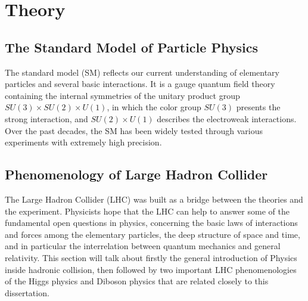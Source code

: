 
\chapter{Theory}

\section{The Standard Model of Particle Physics}
The standard model (SM) reflects our current understanding of elementary particles and several basic interactions.
It is a gauge quantum field theory containing the internal symmetries of the unitary product group $SU(3) \times SU(2) \times U(1)$, 
in which the color group $SU(3)$ presents the strong interaction, and $SU(2) \times U(1)$ describes the electroweak interactions.
Over the past decades, the SM has been widely tested through various experiments with extremely high precision.





\section{Phenomenology of Large Hadron Collider}
The Large Hadron Collider (LHC) was built as a bridge between the theories and the experiment.
Physicists hope that the LHC can help to answer some of the fundamental open questions in physics, 
concerning the basic laws of interactions and forces among the elementary particles, 
the deep structure of space and time, and in particular the interrelation between quantum mechanics and general relativity.
This section will talk about firstly the general introduction of Physics inside hadronic collision,
then followed by two important LHC phenomenologies of the Higgs physics and Diboson physics that are related closely to this dissertation.




